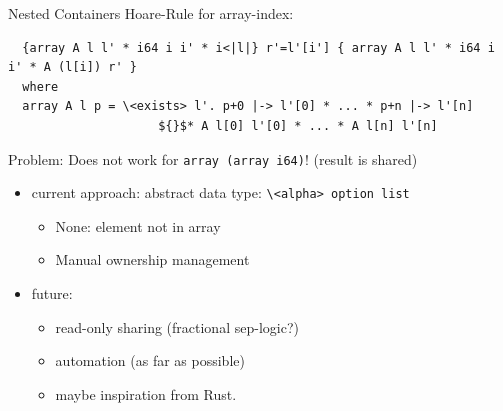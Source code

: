 \documentclass[fleqn]{beamer}
\newcommand{\isai}{\lstinline[language=isabelle,basicstyle=\normalsize\ttfamily\slshape]}
\begin{document}
\begin{frame}[fragile]{Nested Containers}
  \onslide<+->
  Hoare-Rule for array-index:
  \begin{lstlisting}
  {array A l l' * i64 i i' * i<|l|} r'=l'[i'] { array A l l' * i64 i i' * A (l[i]) r' }
  where
  array A l p = \<exists> l'. p+0 |-> l'[0] * ... * p+n |-> l'[n]
                     ${}$* A l[0] l'[0] * ... * A l[n] l'[n]
  \end{lstlisting}

  \onslide<+->
  Problem: Does not work for \isai{array (array i64)}! (result is shared)
  \begin{itemize}
   \item<+-> current approach: abstract data type: \isai$\<alpha> option list$
    \begin{itemize}
     \item None: element not in array
     \item Manual ownership management
    \end{itemize}
   \item<+-> future:
    \begin{itemize}
     \item read-only sharing (fractional sep-logic?)
     \item automation (as far as possible)
     \item maybe inspiration from Rust.


%


    \end{itemize}
  \end{itemize}
\end{frame}
\end{document}
